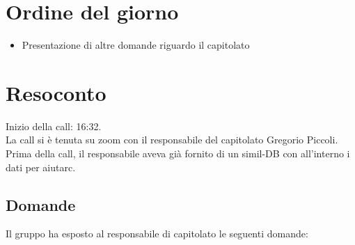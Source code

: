 \section{Ordine del giorno}

\begin{itemize}
	\item Presentazione di altre domande riguardo il capitolato
\end{itemize}

\section{Resoconto}

\noindent 
Inizio della call: 16:32.\\
\noindent La call si è tenuta su zoom con il responsabile del capitolato Gregorio Piccoli. Prima della call, il responsabile aveva già fornito di un simil-DB con all'interno i dati per aiutarc.

\subsection{Domande}
Il gruppo ha esposto al responsabile di capitolato le seguenti domande:

